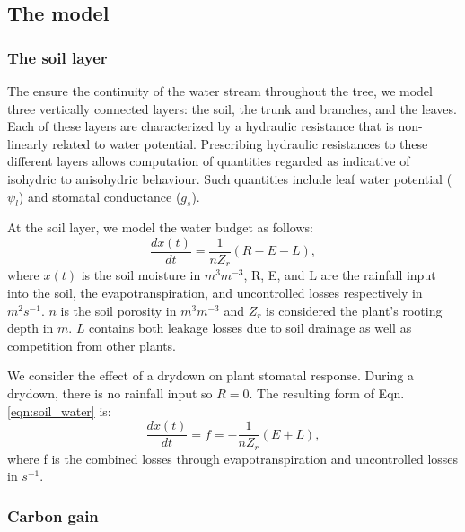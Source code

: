 \documentclass[utf8]{frontiersSCNS} %
\begin{document}
\subsection{The model}

\subsubsection{The soil layer}

The ensure the continuity of the water stream throughout the tree, we model three vertically connected layers: the soil, the trunk and branches, and the leaves. Each of these layers are characterized by a hydraulic resistance that is non-linearly related to water potential. Prescribing hydraulic resistances to these different layers allows computation of quantities regarded as indicative of isohydric to anisohydric behaviour. Such quantities include leaf water potential ($\psi_l$) and stomatal conductance ($g_s$).

At the soil layer, we model the water budget \citep{Rodriguez-Iturbe2007} as follows:
\begin{equation}
    \label{eqn:soil_water}
    \frac{dx(t)}{dt} =\frac{1}{n Z_r}(R - E - L),
\end{equation}
where $x(t)$ is the soil moisture in $m^3m^{-3}$, R, E, and L are the rainfall input into the soil, the evapotranspiration, and uncontrolled losses respectively in $m^2s^{-1}$. $n$ is the soil porosity in $m^3m^{-3}$ and $Z_r$ is considered the plant's rooting depth in $m$. $L$ contains both leakage losses due to soil drainage as well as competition from other plants.

We consider the effect of a drydown on plant stomatal response. During a drydown, there is no rainfall input so $R=0$. The resulting form of Eqn. \ref{eqn:soil_water} is:
\begin{equation}
    \label{eeqn:soil_water_drydown}
    \frac{dx(t)}{dt} = f = - \frac{1}{n Z_r}(E + L),
\end{equation}
where f is the combined losses through evapotranspiration and uncontrolled losses in $s^{-1}$.

\subsubsection{Carbon gain}
\end{document}
